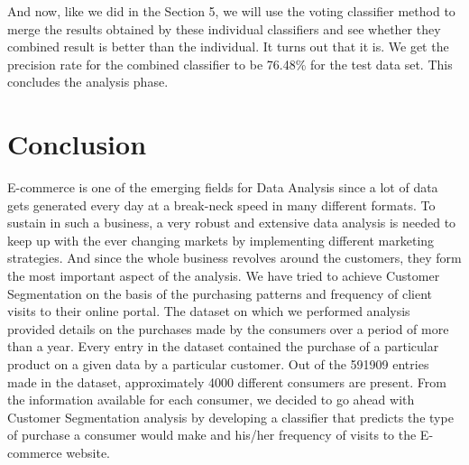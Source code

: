 And now, like we did in the Section 5, we will use the voting classifier method to merge the results obtained by these individual classifiers and see whether they combined result is better than the individual. It turns out that it is. We get the precision rate for the combined classifier to be 76.48\% for the test data set. This concludes the analysis phase.\\

\section*{Conclusion}
E-commerce is one of the emerging fields for Data Analysis since a lot of data gets generated every day at a break-neck speed in many different formats. To sustain in such a business, a very robust and extensive data analysis is needed to keep up with the ever changing markets by implementing different marketing strategies. And since the whole business revolves around the customers, they form the most important aspect of the analysis. We have tried to achieve Customer Segmentation on the basis of the purchasing patterns and frequency of client visits to their online portal. The dataset on which we performed analysis provided details on the purchases made by the consumers over a period of more than a year. Every entry in the dataset contained the purchase of a particular product on a given data by a particular customer. Out of the 591909 entries made in the dataset, approximately 4000 different consumers are present. From the information available for each consumer, we decided to go ahead with Customer Segmentation analysis by developing a classifier that predicts the type of purchase a consumer would make and his/her frequency of visits to the E-commerce website. \\
